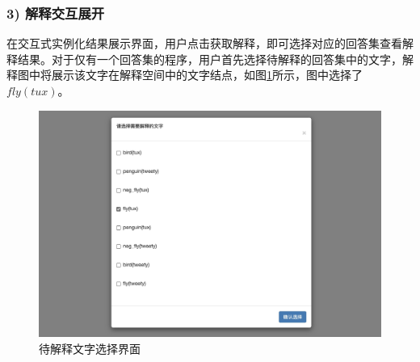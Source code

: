 \subsubsection*{3) 解释交互展开}
在交互式实例化结果展示界面，用户点击获取解释，即可选择对应的回答集查看解释结果。对于仅有一个回答集的程序，用户首先选择待解释的回答集中的文字，解释图中将展示该文字在解释空间中的文字结点，如图\ref{fig:littoselect}所示，图中选择了$fly(tux)$。
\begin{figure}[htbp]
    \centering
    \includegraphics[width=0.8\linewidth]{figures/待解释文字选择.jpg}
    \caption{待解释文字选择界面}
    \label{fig:littoselect}
\end{figure}

